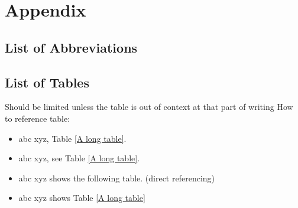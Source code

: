 \chapter{Appendix}
\section{List of Abbreviations}
\section{List of Tables}
Should be limited unless the table is out of context at that part of writing
How to reference table:
\begin{itemize}
	\item abc xyz, Table \ref{A long table}.
	\item abc xyz, see Table \ref{A long table}.
	\item abc xyz shows the following table. (direct referencing)
	\item abc xyz shows Table \ref{A long table}
\end{itemize}

